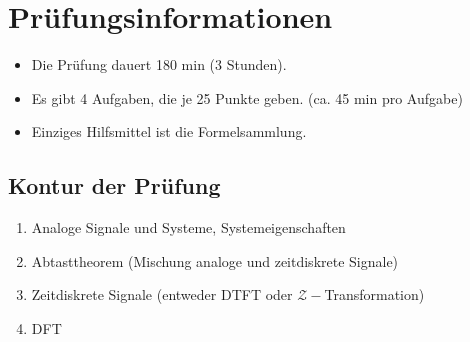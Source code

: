 \documentclass[11pt]{article}
\begin{document}
\pagebreak


\pagebreak

\section*{Prüfungsinformationen}
\vspace*{-0.5cm}
\begin{itemize}
    \item Die Prüfung dauert 180 min (3 Stunden).
    \item Es gibt 4 Aufgaben, die je 25 Punkte geben. (ca. 45 min pro Aufgabe)
    \item Einziges Hilfsmittel ist die Formelsammlung.
\end{itemize}

\subsection*{Kontur der Prüfung}
\vspace*{-0.5cm}
\begin{enumerate}
    \item Analoge Signale und Systeme, Systemeigenschaften
    \item Abtasttheorem (Mischung analoge und zeitdiskrete Signale)
    \item Zeitdiskrete Signale (entweder DTFT oder $\mathcal{Z}-$Transformation)
    \item DFT
\end{enumerate}
\end{document}
